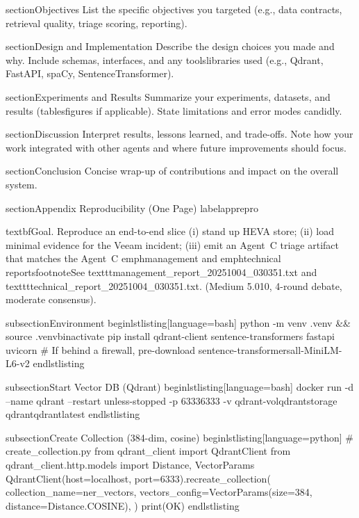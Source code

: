 section{Objectives}
List the specific objectives you targeted (e.g., data contracts, retrieval quality, triage scoring, reporting).

section{Design and Implementation}
Describe the design choices you made and why. Include schemas, interfaces, and any toolslibraries used (e.g., Qdrant, FastAPI, spaCy, SentenceTransformer).

section{Experiments and Results}
Summarize your experiments, datasets, and results (tablesfigures if applicable). State limitations and error modes candidly.

section{Discussion}
Interpret results, lessons learned, and trade-offs. Note how your work integrated with other agents and where future improvements should focus.

section{Conclusion}
Concise wrap-up of contributions and impact on the overall system.


section{Appendix Reproducibility (One Page)}
label{apprepro}

textbf{Goal.} Reproduce an end-to-end slice (i) stand up HEVA store; (ii) load minimal evidence for the Veeam incident; (iii) emit an Agent~C triage artifact that matches the Agent~C emph{management} and emph{technical} reportsfootnote{See texttt{management_report_20251004_030351.txt} and texttt{technical_report_20251004_030351.txt}.} (Medium 5.010, 4-round debate, moderate consensus).

subsection{Environment}
begin{lstlisting}[language=bash]
python -m venv .venv && source .venvbinactivate
pip install qdrant-client sentence-transformers fastapi uvicorn
# If behind a firewall, pre-download sentence-transformersall-MiniLM-L6-v2
end{lstlisting}

subsection{Start Vector DB (Qdrant)}
begin{lstlisting}[language=bash]
docker run -d --name qdrant --restart unless-stopped 
-p 63336333 -v qdrant-volqdrantstorage qdrantqdrantlatest
end{lstlisting}

subsection{Create Collection (384-dim, cosine)}
begin{lstlisting}[language=python]
# create_collection.py
from qdrant_client import QdrantClient
from qdrant_client.http.models import Distance, VectorParams
QdrantClient(host=localhost, port=6333).recreate_collection(
collection_name=ner_vectors,
vectors_config=VectorParams(size=384, distance=Distance.COSINE),
)
print(OK)
end{lstlisting}

